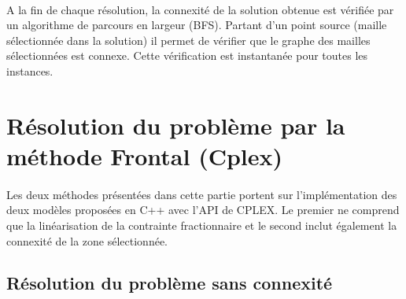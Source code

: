 \documentclass[a4paper, 11pt]{article} %
\begin{document}
\paragraph*{}
A la fin de chaque résolution, la connexité de la solution obtenue est vérifiée par un algorithme de parcours en largeur (BFS). Partant d'un point source (maille sélectionnée dans la solution) il permet de vérifier que le graphe des mailles sélectionnées est connexe. Cette vérification est instantanée pour toutes les instances.


\section{Résolution du problème par la méthode Frontal (Cplex)}

\paragraph*{}
Les deux méthodes présentées dans cette partie portent sur l'implémentation des deux modèles proposées en C++ avec l'API de CPLEX. Le premier ne comprend que la linéarisation de la contrainte fractionnaire et le second inclut également la connexité de la zone sélectionnée.

\subsection{Résolution du problème sans connexité}
\end{document}
